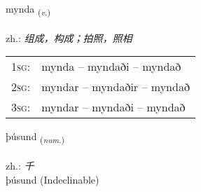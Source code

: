 \documentclass[frontgrid, backgrid]{flacards}\usepackage[]{graphicx}\usepackage[]{xcolor}
\begin{document}
\renewcommand{\flhead}{\vskip5pt \fboxsep=0pt {\small\bfseries\footnotesize Sagnorð | 动词}}
\renewcommand{\fcfoot}{\vskip5pt \fboxsep=0pt \hspace{2pt}{\small\bfseries\footnotesize 1K}}

\renewcommand{\blhead}{\vskip5pt {\small\bfseries\footnotesize Sagnorð | 动词 }}
\renewcommand{\bcfoot}{\vskip5pt \hspace{2pt}{\small\bfseries\footnotesize 1K}}


{mynda \small{\textsubscript{(\textit{v.})}} \\[1ex] %
\textphonetic{[mɪnta]} \\
zh.: \emph{组成，构成；拍照，照相} \\  [2ex]
\renewcommand*{\arraystretch}{0.8}
\begin{tabular}{p{1cm}l}
\textsc{1sg}: & mynda -- myndaði -- myndað \\ 
\textsc{2sg}: & myndar -- myndaðir -- myndað \\ 
\textsc{3sg}: & myndar -- myndaði -- myndað \\ 
\end{tabular}
}


\renewcommand{\flhead}{\vskip5pt \fboxsep=0pt {\small\bfseries\footnotesize Töluorð | 数量词}}
\renewcommand{\fcfoot}{\vskip5pt \fboxsep=0pt \hspace{2pt}{\small\bfseries\footnotesize 1K}}

\renewcommand{\blhead}{\vskip5pt {\small\bfseries\footnotesize Töluorð | 数量词 }}
\renewcommand{\bcfoot}{\vskip5pt \hspace{2pt}{\small\bfseries\footnotesize 1K}}


{þúsund \small{\textsubscript{(\textit{num.})}} \\[1ex]
\textphonetic{[θuːsʏnt]} \\
zh.: \emph{千} \\  [2ex]
þúsund (Indeclinable)}

\renewcommand{\flhead}{\vskip5pt \fboxsep=0pt {\small\bfseries\footnotesize Nafnorð | 名词}}
\renewcommand{\fcfoot}{\vskip5pt \fboxsep=0pt \hspace{2pt}{\small\bfseries\footnotesize 1K}}
\end{document}
